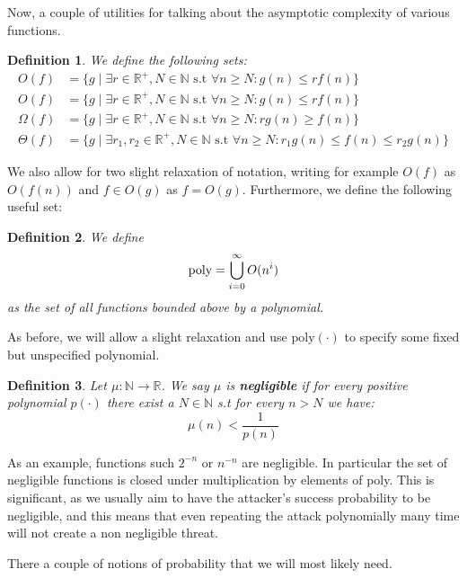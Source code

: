 \documentclass{article}
\newtheorem{definition}{Definition}
\begin{document}
Now, a couple of utilities for talking about the asymptotic complexity of various functions.

\begin{definition} We define the following sets:
\begin{align*}
    O(f) &= \{ g \mid \exists r \in \mathbb{R}^+, N \in \mathbb{N} \text{ s.t } \forall n \geq N : g(n) \leq r f(n)  \} \\
    O(f) &= \{ g \mid \exists r \in \mathbb{R}^+, N \in \mathbb{N} \text{ s.t } \forall n \geq N : g(n) \leq r f(n)  \} \\
    \Omega(f) &= \{ g \mid \exists r \in \mathbb{R}^+, N \in \mathbb{N} \text{ s.t } \forall n \geq N : r g(n) \geq f(n)  \} \\
    \Theta(f) &= \{ g \mid \exists r_1,r_2 \in \mathbb{R}^+, N \in \mathbb{N} \text{ s.t } \forall n \geq N : r_1 g(n) \leq f(n) \leq r_2 g(n)  \}
\end{align*}
\end{definition}
We also allow for two slight relaxation of notation, writing for example $O(f)$ as $O(f(n))$ and $f \in O(g)$ as $f = O(g)$. Furthermore, we define the following useful set:
\begin{definition} We define
\[\text{\normalfont{poly}} = \bigcup_{i = 0}^\infty O(n^i)\]
as the set of all functions bounded above by a polynomial. 
\end{definition}
As before, we will allow a slight relaxation and use $\text{poly}(\cdot)$ to specify some fixed but unspecified polynomial. \\

\begin{definition}
Let $\mu : \mathbb{N} \to \mathbb{R}$. We say $\mu$ is \textbf{negligible} if for every positive polynomial $p(\cdot)$ there exist a $N \in \mathbb{N}$ s.t for every $n > N$ we have:
\[\mu(n) < \frac{1}{p(n)}\]
\end{definition}
As an example, functions such $2^{-n}$ or $n^{-n}$ are negligible. In particular the set of negligible functions is closed under multiplication by elements of poly. This is significant, as we usually aim to have the attacker's success probability to be negligible, and this means that even repeating the attack polynomially many time will not create a non negligible threat. \par

There a couple of notions of probability that we will most likely need.
\end{document}
